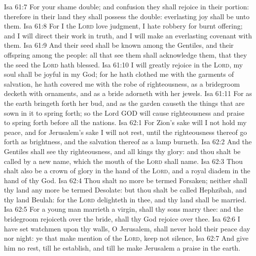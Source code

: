 \vs Isa 61:7 For your shame  double; and  confusion they shall rejoice in their portion: therefore in their land they shall possess the double: everlasting joy shall be unto them.
\vs Isa 61:8 For I the \textsc{Lord} love judgment, I hate robbery for burnt offering; and I will direct their work in truth, and I will make an everlasting covenant with them.
\vs Isa 61:9 And their seed shall be known among the Gentiles, and their offspring among the people: all that see them shall acknowledge them, that they  the seed  the \textsc{Lord} hath blessed.
\vs Isa 61:10 I will greatly rejoice in the \textsc{Lord}, my soul shall be joyful in my God; for he hath clothed me with the garments of salvation, he hath covered me with the robe of righteousness, as a bridegroom decketh  with ornaments, and as a bride adorneth  with her jewels.
\vs Isa 61:11 For as the earth bringeth forth her bud, and as the garden causeth the things that are sown in it to spring forth; so the Lord GOD will cause righteousness and praise to spring forth before all the nations.
\vs Isa 62:1 For Zion's sake will I not hold my peace, and for Jerusalem's sake I will not rest, until the righteousness thereof go forth as brightness, and the salvation thereof as a lamp  burneth.
\vs Isa 62:2 And the Gentiles shall see thy righteousness, and all kings thy glory: and thou shalt be called by a new name, which the mouth of the \textsc{Lord} shall name.
\vs Isa 62:3 Thou shalt also be a crown of glory in the hand of the \textsc{Lord}, and a royal diadem in the hand of thy God.
\vs Isa 62:4 Thou shalt no more be termed Forsaken; neither shall thy land any more be termed Desolate: but thou shalt be called Hephzibah, and thy land Beulah: for the \textsc{Lord} delighteth in thee, and thy land shall be married.
\vs Isa 62:5 For  a young man marrieth a virgin,  shall thy sons marry thee: and  the bridegroom rejoiceth over the bride,  shall thy God rejoice over thee.
\vs Isa 62:6 I have set watchmen upon thy walls, O Jerusalem,  shall never hold their peace day nor night: ye that make mention of the \textsc{Lord}, keep not silence,
\vs Isa 62:7 And give him no rest, till he establish, and till he make Jerusalem a praise in the earth.

